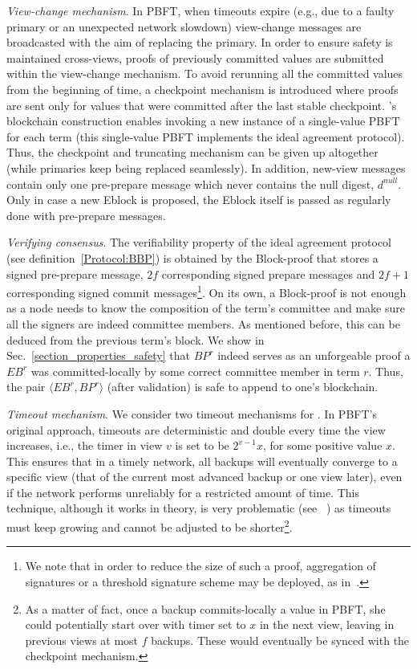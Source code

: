 \textit{View-change mechanism}. 
In PBFT, when timeouts expire (e.g., due to a faulty primary or an unexpected network slowdown) view-change messages are broadcasted with the aim of replacing the primary. In order to ensure safety is maintained cross-views, proofs of previously committed values are submitted within the view-change mechanism. To avoid rerunning all the committed values from the beginning of time, a checkpoint mechanism is introduced where proofs are sent only for values that were committed after the last stable checkpoint. 
\nameNS's blockchain construction enables invoking a new instance of a single-value PBFT for each term (this single-value PBFT implements the ideal agreement protocol). Thus, the checkpoint and truncating mechanism can be given up altogether (while primaries keep being replaced seamlessly). In addition, new-view messages contain only one pre-prepare message which never contains the null digest, $d^{null}$. Only in case a new Eblock is proposed, the Eblock itself is passed as regularly done with pre-prepare messages.

\textit{Verifying consensus}.
The verifiability property of the ideal agreement protocol (see definition~\ref{Protocol:BBP}) is obtained by the Block-proof that stores a signed pre-prepare message, $2f$ corresponding signed prepare messages and $2f+1$ corresponding signed commit messages\footnote{We note that in order to reduce the size of such a proof, aggregation of signatures or a threshold signature scheme may be deployed, as in~\cite{Hot-Stuff}.}. On its own, a Block-proof is not enough as a node needs to know the composition of the term's committee and make sure all the signers are indeed committee members. As mentioned before, this can be deduced from the previous term's block. We show in Sec.~\ref{section_properties_safety} that $BP^r$ indeed serves as an unforgeable proof a $EB^r$ was committed-locally by some correct committee member in term $r$. Thus, the pair $\langle EB^r, BP^r \rangle$ (after validation) is safe to append to one's blockchain.

\textit{Timeout mechanism}.
We consider two timeout mechanisms for \nameNS. In PBFT's original approach, timeouts are deterministic and double every time the view increases, i.e., the timer in view $v$ is set to be $2^{v-1} x$, for some positive value $x$. This ensures that in a timely network, all backups will eventually converge to a specific view (that of the current most advanced backup or one view later), even if the network performs unreliably for a restricted amount of time. This technique, although it works in theory, is very problematic (see ~\cite{Prime}) as timeouts must keep growing and cannot be adjusted to be shorter\footnote{As a matter of fact, once a backup commits-locally a value in PBFT, she could potentially start over with timer set to $x$ in the next view, leaving in previous views at most $f$ backups. These would eventually be synced with the checkpoint mechanism.}.

